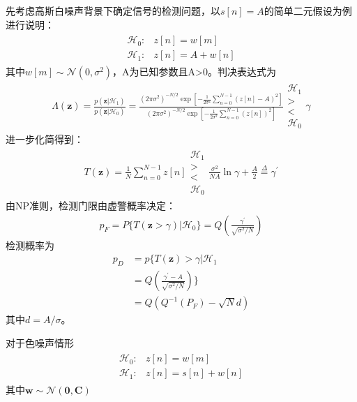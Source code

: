 \documentclass[fontset=windows]{article}
\numberwithin{figure}{section}
\begin{document}
先考虑高斯白噪声背景下确定信号的检测问题，以\(s[n]=A\)的简单二元假设为例进行说明：
\begin{align*}
	\begin{matrix}
		\mathcal{H}_0: & z[n]=w[m]   \\
		\mathcal{H}_1: & z[n]=A+w[n]
	\end{matrix}
\end{align*}
其中\(w[m]\sim \mathcal{N}(0,\sigma^2)\)，A为已知参数且A>0。判决表达式为
\begin{align*}
	\Lambda(\mathbf{z})
	=\frac{p(\mathbf{z}|\mathcal{H}_1)}{p(\mathbf{z}|\mathcal{H}_0)}
	=\frac{(2\pi \sigma^2)^{-N/2}\exp\left[-\frac{1}{2\sigma^2}\sum_{n=0}^{N-1}(z[n]-A)^2\right]}
	{(2\pi \sigma^2)^{-N/2}\exp\left[-\frac{1}{2\sigma^2}\sum_{n=0}^{N-1}(z[n])^2\right]}
	\begin{matrix}
		\mathcal{H}_1 \\>\\<\\\mathcal{H}_0
	\end{matrix}\gamma
\end{align*}
进一步化简得到：
\begin{align*}
	T(\mathbf{z})=\frac{1}{N}\sum_{n=0}^{N-1}z[n]
	\begin{matrix}
		\mathcal{H}_1 \\>\\<\\\mathcal{H}_0
	\end{matrix}
	\frac{\sigma^2}{NA}\ln \gamma+\frac{A}{2}\overset{\Delta}{=}
	\gamma^{\prime}
\end{align*}
由NP准则，检测门限由虚警概率决定：
\begin{align*}
	p_F=P\{T(\mathbf{z}>\gamma)|\mathcal{H}_0\}=Q(\frac{\gamma^{\prime}}{\sqrt{\sigma^2/N}})
\end{align*}
检测概率为
\begin{align*}
	p_D
	 & =p\{T(\mathbf{z})>\gamma|\mathcal{H}_1            \\
	 & =Q(\frac{\gamma^{\prime}-A}{\sqrt{\sigma^2/N}})\} \\
	 & =Q(Q^{-1}(P_F)-\sqrt{N}d)
\end{align*}
其中\(d=A/\sigma\)。

对于色噪声情形
\begin{align*}
	\begin{matrix}
		\mathcal{H}_0: & z[n]=w[m]      \\
		\mathcal{H}_1: & z[n]=s[n]+w[n]
	\end{matrix}
\end{align*}
其中\(\mathbf{w}\sim \mathcal{N}(\mathbf{0},\mathbf{C})\)
\end{document}

